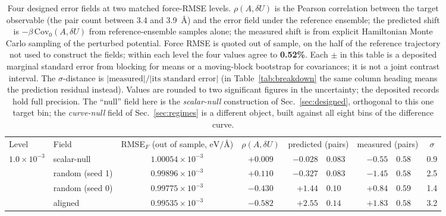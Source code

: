 \documentclass[aip,jcp,reprint,amsmath,amssymb,floatfix]{revtex4-2}
\newcommand{\dU}{\ensuremath{\delta U}}
\newcommand{\Cov}{\ensuremath{\mathrm{Cov}}}
\newcommand{\eVA}{\ensuremath{\mathrm{eV}/\text{\AA}}}
\begin{document}

\begin{table}[t]
\caption{\label{tab:counterexamples}%
Four designed error fields at two matched force-RMSE levels. $\rho(A,\dU)$ is
the Pearson correlation between the target observable (the pair count between
3.4 and 3.9~\AA) and the error field under the reference ensemble; the predicted
shift is $-\beta\,\Cov_0(A,\dU)$ from reference-ensemble samples alone; the
measured shift is from explicit Hamiltonian Monte Carlo sampling of the
perturbed potential. Force RMSE is quoted out of sample, on the half of the
reference trajectory not used to construct the fields; within each level the
four values agree to \textbf{0.52\%}. Each $\pm$ in this table is a deposited
marginal standard error from blocking for means or a moving-block bootstrap for
covariances; it is not a joint contrast interval. The $\sigma$-distance is
$|\text{measured}|/|\text{its standard error}|$ (in Table~\ref{tab:breakdown}
the same column heading means the prediction residual instead). Values are
rounded to two significant figures in the uncertainty; the deposited records
hold full precision. The ``null'' field here is the \emph{scalar-null}
construction of Sec.~\ref{sec:designed}, orthogonal to this one target bin; the
\emph{curve-null} field of Sec.~\ref{sec:regimes} is a different object, built
against all eight bins of the difference curve.}
\begin{ruledtabular}
\begin{tabular}{llccr@{\,$\pm$\,}lr@{\,$\pm$\,}lc}
Level & Field & RMSE$_F$ (out of sample, $\eVA$) & $\rho(A,\dU)$ &
\multicolumn{2}{c}{predicted (pairs)} & \multicolumn{2}{c}{measured (pairs)} &
$\sigma$ \\
\colrule
$1.0\times10^{-3}$ & scalar-null     & $1.00054\times10^{-3}$ & $+0.009$ & $-0.028$ & $0.083$ & $-0.55$ & $0.58$ & 0.9 \\
                   & random (seed 1) & $0.99896\times10^{-3}$ & $+0.110$ & $-0.327$ & $0.083$ & $-1.45$ & $0.58$ & 2.5 \\
                   & random (seed 0) & $0.99775\times10^{-3}$ & $-0.430$ & $+1.44$ & $0.10$ & $+0.84$ & $0.59$ & 1.4 \\
                   & aligned         & $0.99535\times10^{-3}$ & $-0.582$ & $+2.55$ & $0.14$ & $+1.83$ & $0.58$ & 3.2 \\

\end{tabular}
\end{ruledtabular}
\end{table}
\end{document}
